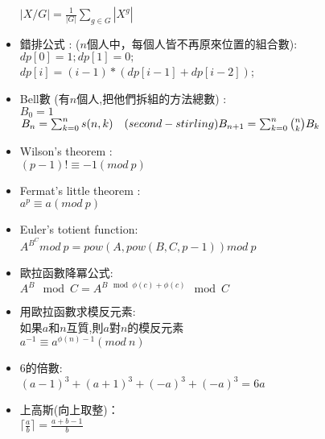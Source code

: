 \begin{itemize}
  $|X/G| = \frac{1}{|G|}\sum\limits_{g\in G} |X^g|$
\item 錯排公式 :  ($n$個人中，每個人皆不再原來位置的組合數): \\
  $dp[0]=1;dp[1]=0;$\\
  $dp[i]=(i-1)*(dp[i-1]+dp[i-2])$;
\item Bell數 (有$n$個人,把他們拆組的方法總數) : \\
  $B_0= 1$\\
  $B_n= \sum_{k=0}^{n} s(n,k)\quad (second-stirling)\\
  B_{n+1}= \sum_{k=0}^{n}{n \choose k} B_k$
\item Wilson's theorem :\\
  $(p-1)! \equiv -1 (mod \ p)$
\item Fermat's little theorem :\\
  $a^p \equiv a (mod \ p)$
\item Euler's totient function:\\
  $ A ^ {B ^ C} mod \ p = pow(A,pow(B,C,p-1)) mod \ p$
\item 歐拉函數降冪公式:\\
  $A^B \mod C=A^{B \mod \phi(c) + \phi(c)}\mod C$
\item 用歐拉函數求模反元素:\\
  如果$a$和$n$互質,則$a$對$n$的模反元素\\
  $a^{-1 }\equiv a^{\phi(n)-1 }(mod \ n)$
\item 6的倍數: \\
 $(a-1)^3 + (a+1)^3 + (-a)^3 + (-a)^3 = 6a$
\item 上高斯(向上取整)：\\
  $\lceil \frac{a}{b} \rceil = \frac{a+b-1}{b}$\\
\end{itemize}

